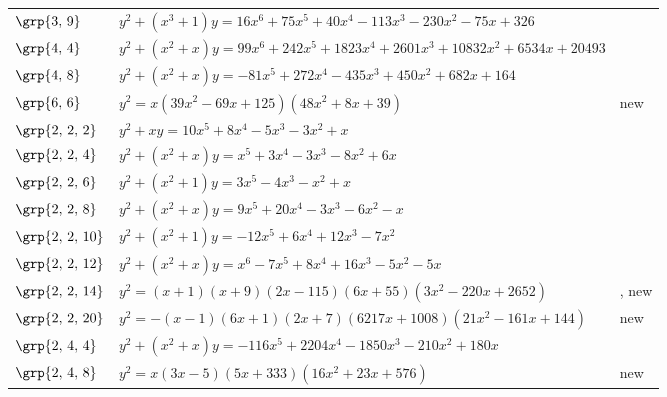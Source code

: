 \begin{longtable}{@{}>{\raggedright\arraybackslash}p{1.35cm}
 >{\raggedright\arraybackslash}p{}
 >{\raggedright\arraybackslash}p{1.1cm}@{}}
$\grp{3,\,9}$ & \href{https://alpha.lmfdb.org/Genus2Curve/Q/?jump=[[326,-75,-230,-113,40,75,16],[1,0,0,1]]}{$y^2 + (x^{3}+1)y = 16x^{6}+75x^{5}+40x^{4}-113x^{3}-230x^{2}-75x+326$} & \cite{Leprevost1995}\\
$\grp{4,\,4}$ & \href{https://alpha.lmfdb.org/Genus2Curve/Q/?jump=[[20493,6534,10832,2601,1823,242,99],[0,1,1]]}{$y^2 + (x^{2}+x)y = 99x^{6}+242x^{5}+1823x^{4}+2601x^{3}+10832x^{2}+6534x+20493$} & \cite{BookerSutherland}\\
$\grp{4,\,8}$ & \href{https://alpha.lmfdb.org/Genus2Curve/Q/?jump=[[164,682,450,-435,272,-81],[0,1,1]]}{$y^2 + (x^{2}+x)y = -81x^{5}+272x^{4}-435x^{3}+450x^{2}+682x+164$} & \cite{BookerSutherland}\\
$\grp{6,\,6}$ & $y^2 = x(39x^{2}-69x+125)(48x^{2}+8x+39)$ & new\\
$\grp{2,\,2,\,2}$ & \href{https://www.lmfdb.org/Genus2Curve/Q/2600/a/338000/1}{$y^2 + xy = 10x^{5}+8x^{4}-5x^{3}-3x^{2}+x$} & \cite{BSSVY}\\
$\grp{2,\,2,\,4}$ & \href{https://www.lmfdb.org/Genus2Curve/Q/3978/a/930852/1}{$y^2 + (x^{2}+x)y = x^{5}+3x^{4}-3x^{3}-8x^{2}+6x$} & \cite{BSSVY}\\
$\grp{2,\,2,\,6}$ & \href{https://www.lmfdb.org/Genus2Curve/Q/816/a/39168/1}{$y^2 + (x^{2}+1)y = 3x^{5}-4x^{3}-x^{2}+x$} & \cite{BSSVY}\\
$\grp{2,\,2,\,8}$ & \href{https://alpha.lmfdb.org/Genus2Curve/Q/?jump=[[0,-1,-6,-3,20,9],[0,1,1]]}{$y^2 + (x^{2}+x)y = 9x^{5}+20x^{4}-3x^{3}-6x^{2}-x$} & \cite{BookerSutherland}\\
$\grp{2,\,2,\,10}$ & \href{https://alpha.lmfdb.org/Genus2Curve/Q/?jump=[[0,0,-7,12,6,-12],[1,0,1]]}{$y^2 + (x^{2}+1)y = -12x^{5}+6x^{4}+12x^{3}-7x^{2}$} & \cite{BookerSutherland}\\
$\grp{2,\,2,\,12}$ & \href{https://alpha.lmfdb.org/Genus2Curve/Q/?jump=[[0,-5,-5,16,8,-7,1],[0,1,1]]}{$y^2 + (x^{2}+x)y = x^{6}-7x^{5}+8x^{4}+16x^{3}-5x^{2}-5x$} & \cite{BookerSutherland}\\
$\grp{2,\,2,\,14}$ & $y^2 = (x+1)(x+9)(2x-115)(6x+55)(3x^{2}-220x+2652)$ & \cite{BookerSutherland}, new\\
$\grp{2,\,2,\,20}$ & $y^2 = -(x-1)(6x+1)(2x+7)(6217x+1008)(21x^{2}-161x+144)$ & new\\
$\grp{2,\,4,\,4}$ & \href{https://alpha.lmfdb.org/Genus2Curve/Q/?jump=[[0,180,-210,-1850,2204,-116],[0,1,1]]}{$y^2 + (x^{2}+x)y = -116x^{5}+2204x^{4}-1850x^{3}-210x^{2}+180x$} & \cite{BookerSutherland}\\
$\grp{2,\,4,\,8}$ & $y^2 = x(3x-5)(5x+333)(16x^{2}+23x+576)$ & new\\

\end{longtable}
